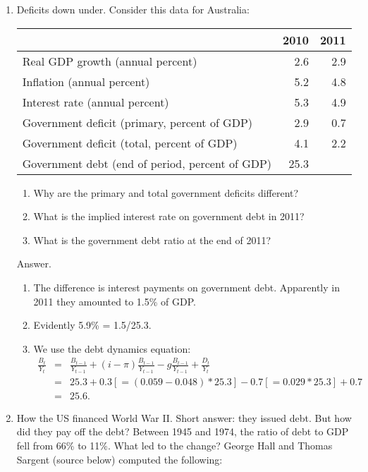 \documentclass[letterpaper,12pt]{article}
\begin{document}
\begin{enumerate}

\item Deficits down under.
Consider this data for Australia:
%
\begin{center}
\begin{tabular}{lrr}
\toprule
        & 2010 & 2011 \\
\midrule
Real GDP growth (annual percent) & 2.6 & 2.9 \\
Inflation  (annual percent)      & 5.2 & 4.8 \\
Interest rate  (annual percent)  & 5.3 & 4.9 \\
Government deficit (primary, percent of GDP)    & 2.9 & 0.7 \\
Government deficit (total, percent of GDP)      & 4.1 & 2.2 \\
Government debt (end of period, percent of GDP) & 25.3 \\
\bottomrule
\end{tabular}
\end{center}
\begin{enumerate}
\item Why are the primary and total government deficits different?
\item What is the implied interest rate on government debt in 2011?
\item What is the government debt ratio at the end of 2011?
\end{enumerate}

Answer.
\begin{enumerate}
\item The difference is interest payments on government debt.
Apparently in 2011 they amounted to 1.5\% of GDP.
\item Evidently 5.9\% = 1.5/25.3.
\item We use the debt dynamics equation:
\begin{eqnarray*}
    \frac{B_{t}}{Y_t}
            &=&
                \frac{B_{t-1}}{Y_{t-1}} + (i-\pi) \frac{B_{t-1}}{Y_{t-1}}
                - g \frac{B_{t-1}}{Y_{t-1}}
             +    \frac{D_{t}}{Y_{t}}  \\
             &=& 25.3 + 0.3 [=(0.059-0.048)*25.3] - 0.7 [=0.029*25.3] + 0.7 \\
             &=&  25.6 .
\end{eqnarray*}

\end{enumerate}


\item How the US financed World War II.
Short answer:  they issued debt.
But how did they pay off the debt?
Between 1945 and 1974, the ratio of debt to GDP fell from 66\% to 11\%.
What led to the change?
George Hall and Thomas Sargent (source below) computed the following:


\end{enumerate}
\end{document}
